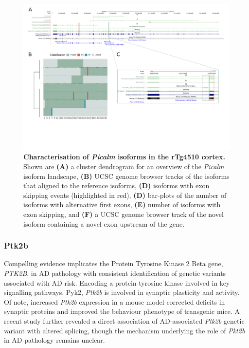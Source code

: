 \begin{landscape}
	\begin{figure}[htp]
		\centering
		\captionsetup{width=1.3\textwidth}
		\includegraphics[page=8,trim={0 1cm 0 0},scale = 0.8]{Figures/TargetGenes_Annotation_Landscape.pdf}
		\caption[Characterisation of the \textit{Picalm} isoform landscape]%
		{\textbf{Characterisation of \textit{Picalm} isoforms in the rTg4510 cortex.} Shown are \textbf{(A)} a cluster dendrogram for an overview of the \textit{Picalm} isoform landscape, \textbf{(B)} UCSC genome browser tracks of the isoforms that aligned to the reference isoforms, \textbf{(D)} isoforms with exon skipping events (highlighted in red), \textbf{(D)} bar-plots of the number of isoforms with alternative first exons, \textbf{(E)} number of isoforms with exon skipping, and \textbf{(F)} a UCSC genome browser track of the novel isoform containing a novel exon upstream of the gene.}    
		\label{fig:picalm}
	\end{figure}
\end{landscape}
\restoregeometry

\newpage
\subsubsection{Ptk2b}
Compelling evidence implicates the Protein Tyrosine Kinase 2 Beta gene, \textit{PTK2B}, in AD pathology with consistent identification of genetic variants associated with AD risk\cite{Lambert2013,Kunkle2019}. Encoding a protein tyrosine kinase involved in key signalling pathways, Pyk2, \textit{Ptk2b} is involved in synaptic plasticity and activity. Of note, increased \textit{Ptk2b} expression in a mouse model corrected deficits in synaptic proteins and improved the behaviour phenotype of transgenic mice\cite{Giralt2018}. A recent study further revealed a direct association of AD-associated \textit{Ptk2b} genetic variant with altered splicing\cite{Raj2018}, though the mechanism underlying the role of \textit{Pkt2b} in AD pathology remains unclear.

